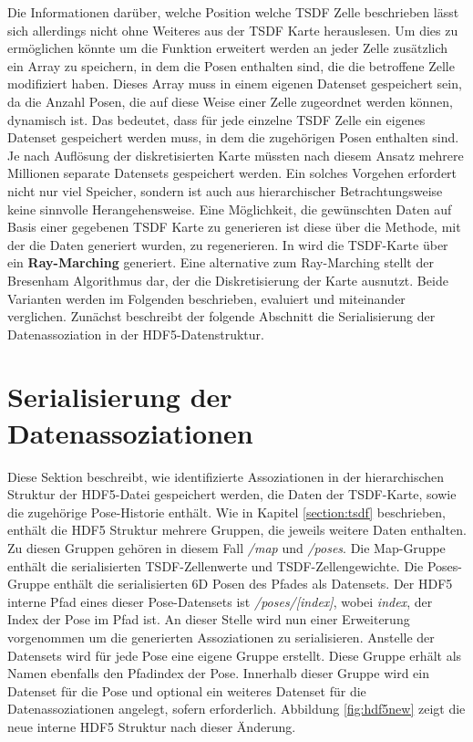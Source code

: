 Die Informationen darüber, welche Position welche TSDF Zelle beschrieben lässt sich allerdings nicht ohne Weiteres aus der TSDF Karte herauslesen.
Um dies zu ermöglichen könnte \cite{HATSDF} um die Funktion erweitert werden an jeder Zelle zusätzlich ein Array zu speichern, in dem die Posen enthalten sind, die die betroffene Zelle modifiziert haben. Dieses Array muss in einem eigenen Datenset gespeichert sein, da die Anzahl Posen, die auf diese Weise einer Zelle zugeordnet werden können, dynamisch ist. Das bedeutet, dass für jede einzelne TSDF Zelle ein eigenes Datenset gespeichert werden muss, in dem die zugehörigen Posen enthalten sind. Je nach Auflösung der diskretisierten Karte müssten nach diesem Ansatz mehrere Millionen separate Datensets gespeichert werden. Ein solches Vorgehen erfordert nicht nur viel Speicher, sondern ist auch aus hierarchischer Betrachtungsweise keine sinnvolle Herangehensweise.
Eine Möglichkeit, die gewünschten Daten auf Basis einer gegebenen TSDF Karte zu generieren ist diese über die Methode, mit der die Daten generiert wurden, zu regenerieren. In \cite{HATSDF} wird die TSDF-Karte über ein \textbf{Ray-Marching} generiert. Eine alternative zum Ray-Marching stellt der Bresenham Algorithmus dar, der die Diskretisierung der Karte ausnutzt.
Beide Varianten werden im Folgenden beschrieben, evaluiert und miteinander verglichen.
Zunächst beschreibt der folgende Abschnitt die Serialisierung der Datenassoziation in der HDF5-Datenstruktur.

\section{Serialisierung der Datenassoziationen}


Diese Sektion beschreibt, wie identifizierte Assoziationen in der hierarchischen Struktur der HDF5-Datei gespeichert werden, die Daten der TSDF-Karte, sowie die zugehörige Pose-Historie enthält.
Wie in Kapitel \ref{section:tsdf} beschrieben, enthält die HDF5 Struktur mehrere Gruppen, die jeweils weitere Daten enthalten. Zu diesen Gruppen gehören in diesem Fall \textit{/map} und \textit{/poses}.
Die Map-Gruppe enthält die serialisierten TSDF-Zellenwerte und TSDF-Zellengewichte. Die Poses-Gruppe enthält die serialisierten 6D Posen des Pfades als Datensets.
Der HDF5 interne Pfad eines dieser Pose-Datensets ist \textit{/poses/[index]}, wobei \textit{index}, der Index der Pose im Pfad ist.
An dieser Stelle wird nun einer Erweiterung vorgenommen um die generierten Assoziationen zu serialisieren. Anstelle der Datensets wird für jede Pose eine eigene Gruppe erstellt. Diese Gruppe erhält als Namen ebenfalls den Pfadindex der Pose. Innerhalb dieser Gruppe wird ein Datenset für die Pose und optional ein weiteres Datenset für die Datenassoziationen angelegt, sofern erforderlich.
Abbildung \ref{fig:hdf5new} zeigt die neue interne HDF5 Struktur nach dieser Änderung.

